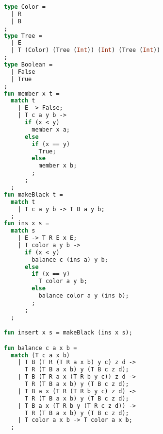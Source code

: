 
\begin{lstlisting}[breaklines=true,language=ML,caption={Red-black tree implementation},label={lst:rbimpl},mathescape=true]
type Color = 
  | R
  | B
;
type Tree = 
  | E 
  | T (Color) (Tree (Int)) (Int) (Tree (Int))
;
type Boolean = 
  | False
  | True
;
fun member x t =
  match t
    | E -> False;
    | T c a y b ->
      if (x < y)
        member x a;
      else
        if (x == y)
          True;
        else
          member x b;
        ;
      ;
  ;
fun makeBlack t =
  match t
    | T c a y b -> T B a y b;
  ;
fun ins x s =
  match s
    | E -> T R E x E;
    | T color a y b -> 
      if (x < y)
        balance c (ins a) y b;
      else
        if (x == y)
          T color a y b;
        else
          balance color a y (ins b);
        ;
      ;
  ;

fun insert x s = makeBlack (ins x s);

fun balance c a x b =
  match (T c a x b)
    | T B (T R (T R a x b) y c) z d -> 
      T R (T B a x b) y (T B c z d);
    | T B (T R a x (T R b y c)) z d ->
      T R (T B a x b) y (T B c z d);
    | T B a x (T R (T R b y c) z d) ->
      T R (T B a x b) y (T B c z d);
    | T B a x (T R b y (T R c z d)) ->
      T R (T B a x b) y (T B c z d);
    | T color a x b -> T color a x b;
  ;
\end{lstlisting}
